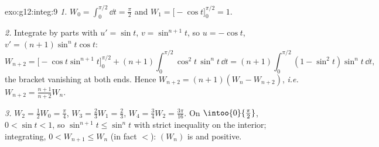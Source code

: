 \begin{solution}{exo:g12:integ:9}
\emph{1.} $W_0 = \int_0^{\pi/2} \dd t = \frac{\pi}{2}$ and
$W_1 = \bigl[-\cos t\bigr]_0^{\pi/2} = 1$.

\emph{2.} Integrate by parts with $u' = \sin t$, $v = \sin^{n+1} t$, so
$u = -\cos t$, $v' = (n+1)\sin^n t \cos t$:
\[
W_{n+2} = \bigl[-\cos t \sin^{n+1} t\bigr]_0^{\pi/2}
+ (n+1)\int_0^{\pi/2} \cos^2 t\,\sin^n t\,\dd t
= (n+1)\int_0^{\pi/2} (1 - \sin^2 t)\sin^n t\,\dd t,
\]
the bracket vanishing at both ends. Hence
$W_{n+2} = (n+1)(W_n - W_{n+2})$, \emph{i.e.}
$W_{n+2} = \frac{n+1}{n+2} W_n$.

\emph{3.} $W_2 = \frac12 W_0 = \frac{\pi}{4}$,
$W_3 = \frac23 W_1 = \frac23$,
$W_4 = \frac34 W_2 = \frac{3\pi}{16}$.
On $\intoo{0}{\frac\pi2}$, $0 < \sin t < 1$, so
$\sin^{n+1} t \leq \sin^n t$ with strict inequality on the interior;
integrating, $0 < W_{n+1} \leq W_n$ (in fact $<$): $(W_n)$ is  and
positive.
\end{solution}

